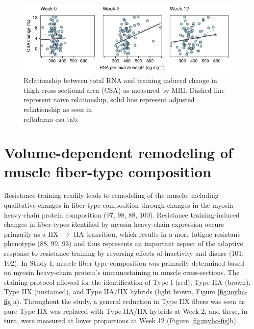 \documentclass[twoside,10pt]{gihclass} %
\begin{document}
\begin{figure}

{\centering \includegraphics{thesis_files/figure-latex/rrna-csa-fig-1} 

}

\caption[Relationship between total RNA and training induced muscle growth]{Relationship between total RNA and training induced change in thigh cross sectional-area (CSA) as measured by MRI. Dashed line represent naive relationship, solid line represent adjusted reliationship as seen in \\ref{tab:rna-csa-tab}.}\label{fig:rrna-csa-fig}
\end{figure}
\hypertarget{volume-dependent-remodeling-of-muscle-fiber-type-composition}{%
\section{Volume-dependent remodeling of muscle fiber-type composition}\label{volume-dependent-remodeling-of-muscle-fiber-type-composition}}

Resistance training readily leads to remodeling of the muscle, including qualitative changes in fiber type composition through changes in the myosin heavy-chain protein composition
(97, 98, 88, 100).
Resistance training-induced changes in fiber-types identified by myosin heavy-chain expression occurs primarily as a IIX \(\rightarrow\) IIA transition, which results in a more fatigue-resistant phenotype
(88, 99, 93)
and thus represents an important aspect of the adaptive response to resistance training by reversing effects of inactivity and disuse
(101, 102).
In Study I, muscle fiber-type composition was primarily determined based on myosin heavy-chain protein's immunostaining in muscle cross-sections. The staining protocol allowed for the identification of Type I (red), Type IIA (brown), Type IIX (unstained), and Type IIA/IIX hybrids (light brown, Figure \ref{fig:myhc-fig}a). Throughout the study, a general reduction in Type IIX fibers was seen as pure Type IIX was replaced with Type IIA/IIX hybrids at Week 2, and these, in turn, were measured at lower proportions at Week 12 (Figure \ref{fig:myhc-fig}b).
\end{document}
